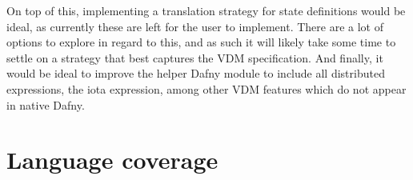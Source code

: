 \documentclass{entcs}
\begin{document}
On top of this, implementing a translation strategy for state definitions would be ideal, as currently these are left for the user to implement. There are a lot of options to explore in regard to this, and as such it will likely take some time to settle on a strategy that best captures the VDM specification. And finally, it would be ideal to improve the helper Dafny module to include all distributed expressions, the iota expression, among other VDM features which do not appear in native Dafny.




\clearpage 
\appendix

\section{Language coverage}\label{appendix:coverage}
\end{document}
